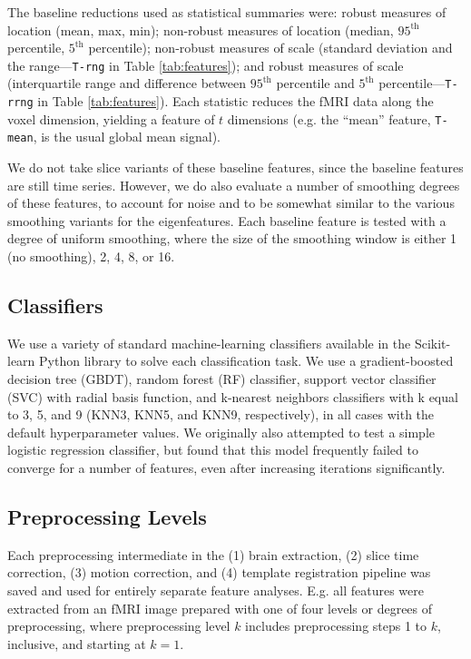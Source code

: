 \documentclass[12pt]{spieman}  %
\newcommand{\code}[1]{\small\texttt{#1}\normalsize}
\begin{document}
\begin{spacing}{2}
The baseline reductions used as statistical summaries were: robust measures of
location (mean, max, min); non-robust measures of location (median,
\(95^{\text{th}}\) percentile, \(5^{\text{th}}\) percentile); non-robust
measures of scale (standard deviation and the range—\code{T-rng} in Table
\ref{tab:features}); and robust measures of scale (interquartile range and
difference between \(95^{\text{th}}\) percentile and \(5^{\text{th}}\)
percentile—\code{T-rrng} in Table \ref{tab:features}). Each statistic reduces
the fMRI data along the voxel dimension, yielding a feature of \(t\) dimensions
(e.g. the ``mean'' feature, \code{T-mean}, is the usual global mean signal).

We do not take slice variants of these baseline features, since the baseline
features are still time series. However, we do also evaluate a number of
smoothing degrees of these features, to account for noise and to be somewhat
similar to the various smoothing variants for the eigenfeatures. Each baseline
feature is tested with a degree of uniform smoothing, where the size of the
smoothing window is either 1 (no smoothing), 2, 4, 8, or 16.


\subsection{Classifiers}

We use a variety of standard machine-learning classifiers available in the
Scikit-learn\cite{pedregosaScikitlearnMachineLearning2011} Python library to
solve each classification task. We use a gradient-boosted decision tree (GBDT),
random forest (RF) classifier, support vector classifier (SVC) with radial
basis function, and k-nearest neighbors classifiers with k equal to 3, 5, and 9
(KNN3, KNN5, and KNN9, respectively), in all cases with the default
hyperparameter values. We originally also attempted to test a simple logistic
regression classifier, but found that this model frequently failed to converge
for a number of features, even after increasing iterations significantly.


\subsection{Preprocessing Levels}

Each preprocessing intermediate in the (1) brain extraction, (2) slice time
correction, (3) motion correction, and (4) template registration pipeline was
saved and used for entirely separate feature analyses. E.g. all features were
extracted from an fMRI image prepared with one of four levels or degrees of
preprocessing, where preprocessing level \(k\) includes preprocessing steps 1
to \(k\), inclusive, and starting at \(k = 1\).



\end{spacing}
\end{document}
